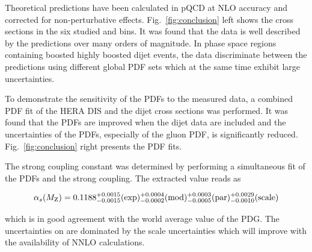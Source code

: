 Theoretical predictions have been calculated in pQCD at NLO accuracy and
corrected for non-perturbative effects. Fig.~\ref{fig:conclusion} left shows the
cross sections in the six studied \ystar and \yboost bins. It was found that the
data is well described by the predictions over many orders of magnitude. In
phase space regions containing boosted highly boosted dijet events, the data
discriminate between the predictions using different global PDF sets which at
the same time exhibit large uncertainties.

To demonstrate the sensitivity of the PDFs to the measured data, a combined PDF
fit of the HERA DIS and the dijet cross sections was performed. It was found
that the PDFs are improved when the dijet data are included and the
uncertainties of the PDFs, especially of the gluon PDF, is significantly
reduced. Fig.~\ref{fig:conclusion} right presents the PDF fits.

The strong coupling constant \asmz was determined by performing a simultaneous
fit of the PDFs and the strong coupling. The extracted value reads as

\begin{equation*}
  \alpha_{s}(M_\mathrm{Z}) = 0.1188_{-0.0015}^{+0.0015}(\mathrm{exp})_{-0.0002}^{+0.0004}(\mathrm{mod})_{-0.0005}^{+0.0003}(\mathrm{par})_{-0.0010}^{+0.0029}(\mathrm{scale})
\end{equation*}

which is in good agreement with the world average value of the PDG. The
uncertainties on \asmz are dominated by the scale uncertainties which will
improve with the availability of NNLO calculations.
